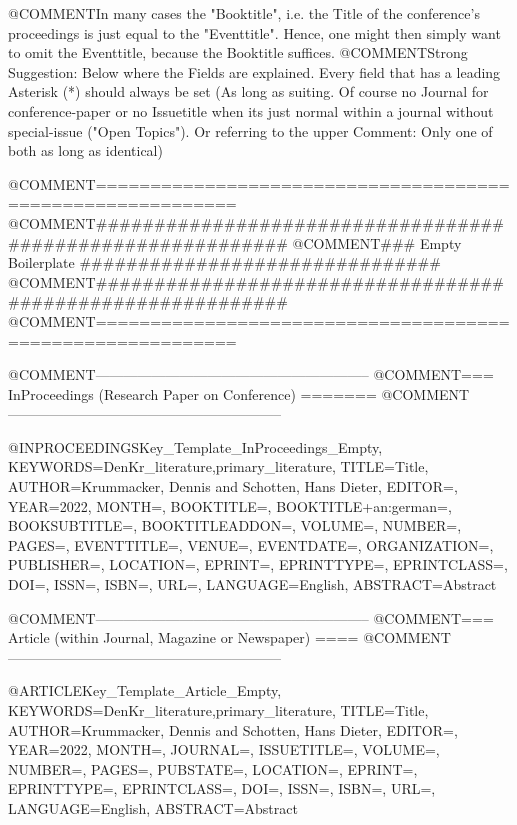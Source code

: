 
@COMMENT{In many cases the "Booktitle", i.e. the Title of the conference's proceedings is just equal to the "Eventtitle". Hence, one might then simply want to omit the Eventtitle, because the Booktitle suffices.}
@COMMENT{Strong Suggestion: Below where the Fields are explained. Every field that has a leading Asterisk (*) should always be set (As long as suiting. Of course no Journal for conference-paper or no Issuetitle when its just normal within a journal without special-issue ("Open Topics"). Or referring to the upper Comment: Only one of both as long as identical)}




@COMMENT{===========================================================}
@COMMENT{###########################################################}
@COMMENT{###    Empty Boilerplate    ###############################}
@COMMENT{###########################################################}
@COMMENT{===========================================================}


@COMMENT{-----------------------------------------------------------}
@COMMENT{===  InProceedings  (Research Paper on Conference)  =======}
@COMMENT{-----------------------------------------------------------}

@INPROCEEDINGS{Key_Template_InProceedings_Empty,
	KEYWORDS={DenKr_literature,primary_literature},
	TITLE={\begingroup
		{Title}\endgroup},
	AUTHOR={Krummacker, Dennis and Schotten, Hans Dieter},
	EDITOR={},
	YEAR={2022},
	MONTH={},
	BOOKTITLE={},
	BOOKTITLE+an:german={},
	BOOKSUBTITLE={},
	BOOKTITLEADDON={},
	VOLUME={},
	NUMBER={},
	PAGES={},
	EVENTTITLE={},
	VENUE={},
	EVENTDATE={},
	ORGANIZATION={},
	PUBLISHER={},
	LOCATION={},
	EPRINT={},
	EPRINTTYPE={},
	EPRINTCLASS={},
	DOI={},
	ISSN={},
	ISBN={},
	URL={},
	LANGUAGE={English},
	ABSTRACT={\begingroup
		{Abstract}\endgroup}
}



@COMMENT{-----------------------------------------------------------}
@COMMENT{===  Article  (within Journal, Magazine or Newspaper)  ====}
@COMMENT{-----------------------------------------------------------}

@ARTICLE{Key_Template_Article_Empty,
	KEYWORDS={DenKr_literature,primary_literature},
	TITLE={\begingroup
		{Title}\endgroup},
	AUTHOR={Krummacker, Dennis and Schotten, Hans Dieter},
	EDITOR={},
	YEAR={2022},
	MONTH={},
	JOURNAL={},
	ISSUETITLE={},
	VOLUME={},
	NUMBER={},
	PAGES={},
	PUBSTATE={},
	LOCATION={},
	EPRINT={},
	EPRINTTYPE={},
	EPRINTCLASS={},
	DOI={},
	ISSN={},
	ISBN={},
	URL={},
	LANGUAGE={English},
	ABSTRACT={\begingroup
		{Abstract}\endgroup}
}










